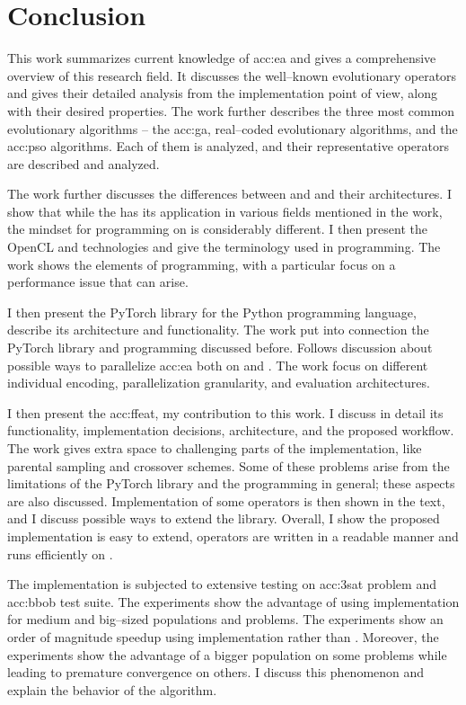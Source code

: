 \chapter{Conclusion}
\label{chap:conclusion}

This work summarizes current knowledge of \acrlong*{acc:ea} and gives a comprehensive overview of this research field. It discusses the well--known evolutionary operators and gives their detailed analysis from the implementation point of view, along with their desired properties. The work further describes the three most common evolutionary algorithms -- the \acrlong{acc:ga}, real--coded evolutionary algorithms, and the \acrlong{acc:pso} algorithms. Each of them is analyzed, and their representative operators are described and analyzed.

The work further discusses the differences between \cpu and \gpu and their architectures. I show that while the \gpu has its application in various fields mentioned in the work, the mindset for programming on \gpu is considerably different. I then present the OpenCL and \cuda technologies and give the terminology used in \gpu programming. The work shows the elements of \cuda programming, with a particular focus on a performance issue that can arise. 

I then present the PyTorch library for the Python programming language, describe its architecture and functionality. The work put into connection the PyTorch library and \cuda programming discussed before. Follows discussion about possible ways to parallelize \acrlong{acc:ea} both on \cpu and \gpuns. The work focus on different individual encoding, parallelization granularity, and evaluation architectures.

I then present the \acrfull{acc:ffeat}, my contribution to this work. I discuss in detail its functionality, implementation decisions, architecture, and the proposed workflow. The work gives extra space to challenging parts of the implementation, like parental sampling and crossover schemes. Some of these problems arise from the limitations of the PyTorch library and the \cuda programming in general; these aspects are also discussed. Implementation of some operators is then shown in the text, and I discuss possible ways to extend the library. Overall, I show the proposed implementation is easy to extend, operators are written in a readable manner and runs efficiently on \gpuns.

The implementation is subjected to extensive testing on \acrshort{acc:3sat} problem and \acrshort{acc:bbob} test suite. The experiments show the advantage of using \cuda implementation for medium and big--sized populations and problems. The experiments show an order of magnitude speedup using \cuda implementation rather than \cpuns. Moreover, the experiments show the advantage of a bigger population on some problems while leading to premature convergence on others. I discuss this phenomenon and explain the behavior of the algorithm.

